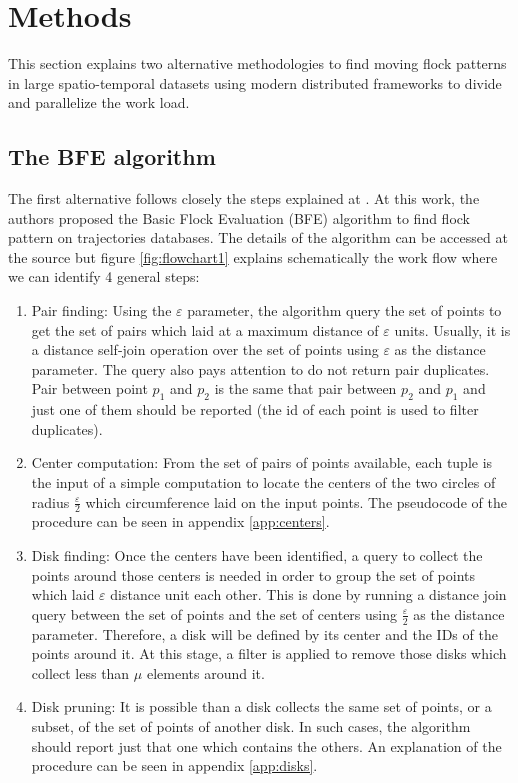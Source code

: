\documentclass[journal,onecolumn]{IEEEtran}
\begin{document}
% 

\section{Methods}
This section explains two alternative methodologies to find moving flock patterns in large spatio-temporal datasets using modern distributed frameworks to divide and parallelize the work load.

\subsection{The BFE algorithm}
The first alternative follows closely the steps explained at \cite{vieira_2009}.  At this work, the authors proposed the Basic Flock Evaluation (BFE) algorithm to find flock pattern on trajectories databases.  The details of the algorithm can be accessed at the source but figure \ref{fig:flowchart1} explains schematically the work flow where we can identify 4 general steps:

\begin{enumerate}
    \item Pair finding:  Using the $\varepsilon$ parameter, the algorithm query the set of points to get the set of pairs which laid at a maximum distance of $\varepsilon$ units.  Usually, it is a distance self-join operation over the set of points using $\varepsilon$ as the distance parameter.  The query also pays attention to do not return pair duplicates.  Pair between point $p_1$ and $p_2$ is the same that pair between $p_2$ and $p_1$ and just one of them should be reported (the id of each point is used to filter duplicates).
    \item Center computation:  From the set of pairs of points available, each tuple is the input of a simple computation to locate the centers of the two circles of radius $\frac{\varepsilon}{2}$ which circumference laid on the input points.  The pseudocode of the procedure can be seen in appendix \ref{app:centers}.
    \item Disk finding: Once the centers have been identified, a query to collect the points around those centers is needed in order to group the set of points which laid $\varepsilon$ distance unit each other.  This is done by running a distance join query between the set of points and the set of centers using $\frac{\varepsilon}{2}$ as the distance parameter. Therefore, a disk will be defined by its center and the IDs of the points around it. At this stage, a filter is applied to remove those disks which collect less than $\mu$ elements around it.
    \item Disk pruning: It is possible than a disk collects the same set of points, or a subset, of the set of points of another disk.  In such cases, the algorithm should report just that one which contains the others.  An explanation of the procedure can be seen in appendix \ref{app:disks}.
\end{enumerate}
\end{document}
